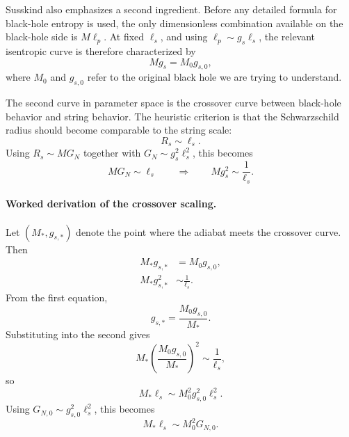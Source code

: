 Susskind also emphasizes a second ingredient. Before any detailed formula for black-hole entropy is used, the only dimensionless combination available on the black-hole side is \(M\ell_p\). At fixed \(\ell_s\), and using \(\ell_p \sim g_s\ell_s\), the relevant isentropic curve is therefore characterized by
\begin{equation}
M g_s = M_0 g_{s,0},
\end{equation}
where \(M_0\) and \(g_{s,0}\) refer to the original black hole we are trying to understand.

The second curve in parameter space is the crossover curve between black-hole behavior and string behavior. The heuristic criterion is that the Schwarzschild radius should become comparable to the string scale:
\begin{equation}
R_s \sim \ell_s.
\end{equation}
Using \(R_s \sim M G_N\) together with \(G_N \sim g_s^2\ell_s^2\), this becomes
\begin{equation}
M G_N \sim \ell_s
\qquad \Longrightarrow \qquad
M g_s^2 \sim \frac{1}{\ell_s}.
\end{equation}

\paragraph{Worked derivation of the crossover scaling.}
Let \((M_\ast,g_{s,\ast})\) denote the point where the adiabat meets the crossover curve. Then
\begin{align}
M_\ast g_{s,\ast} &= M_0 g_{s,0}, \\
M_\ast g_{s,\ast}^2 &\sim \frac{1}{\ell_s}.
\end{align}
From the first equation,
\begin{equation}
g_{s,\ast}=\frac{M_0 g_{s,0}}{M_\ast}.
\end{equation}
Substituting into the second gives
\begin{equation}
M_\ast \left(\frac{M_0 g_{s,0}}{M_\ast}\right)^2 \sim \frac{1}{\ell_s},
\end{equation}
so
\begin{equation}
M_\ast \ell_s \sim M_0^2 g_{s,0}^2 \ell_s^2.
\end{equation}
Using \(G_{N,0}\sim g_{s,0}^2\ell_s^2\), this becomes
\begin{equation}
M_\ast \ell_s \sim M_0^2 G_{N,0}.
\end{equation}

